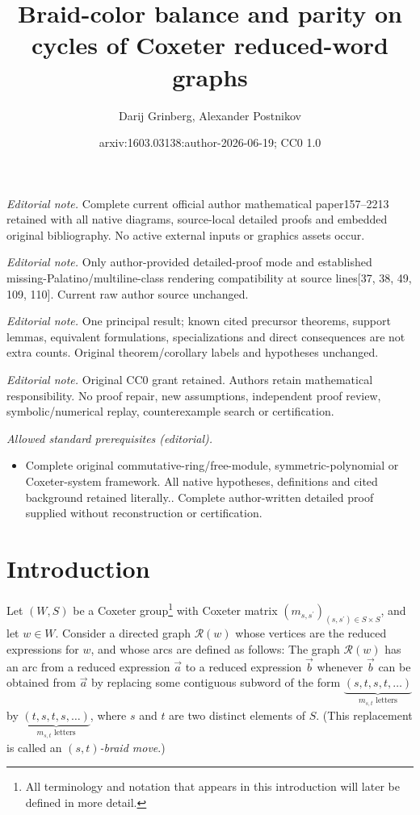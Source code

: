 \documentclass[numbers=enddot,12pt,final,onecolumn,notitlepage,abstracton]{scrartcl}%
\title{Braid-color balance and parity on cycles of Coxeter reduced-word graphs}
\author{Darij Grinberg, Alexander Postnikov}
\date{arxiv:1603.03138:author-2026-06-19; CC0 1.0}
\theoremstyle{definition}
\begin{document}
\maketitle
\noindent\textit{Editorial note.} Complete current official author mathematical paper157--2213 retained with all native diagrams, source-local detailed proofs and embedded original bibliography. No active external inputs or graphics assets occur.\par\medskip
\noindent\textit{Editorial note.} Only author-provided detailed-proof mode and established missing-Palatino/multiline-class rendering compatibility at source lines[37, 38, 49, 109, 110]. Current raw author source unchanged.\par\medskip
\noindent\textit{Editorial note.} One principal result; known cited precursor theorems, support lemmas, equivalent formulations, specializations and direct consequences are not extra counts. Original theorem/corollary labels and hypotheses unchanged.\par\medskip
\noindent\textit{Editorial note.} Original CC0 grant retained. Authors retain mathematical responsibility. No proof repair, new assumptions, independent proof review, symbolic/numerical replay, counterexample search or certification.\par\medskip
\noindent\textit{Allowed standard prerequisites (editorial).}\begin{itemize}
\item Complete original commutative-ring/free-module, symmetric-polynomial or Coxeter-system framework. All native hypotheses, definitions and cited background retained literally.. Complete author-written detailed proof supplied without reconstruction or certification.
\end{itemize}\medskip
\section*{Introduction}

Let $\left(  W,S\right)  $ be a Coxeter group\footnote{All terminology and
notation that appears in this introduction will later be defined in more
detail.} with Coxeter matrix $\left(  m_{s,s^{\prime}}\right)  _{\left(
s,s^{\prime}\right)  \in S\times S}$, and let $w\in W$. Consider a directed
graph $\mathcal{R}\left(  w\right)  $ whose vertices are the reduced
expressions for $w$, and whose arcs are defined as follows: The graph
$\mathcal{R}\left(  w\right)  $ has an arc from a reduced expression
$\overrightarrow{a}$ to a reduced expression $\overrightarrow{b}$ whenever
$\overrightarrow{b}$ can be obtained from $\overrightarrow{a}$ by replacing
some contiguous subword of the form $\underbrace{\left(  s,t,s,t,\ldots
\right)  }_{m_{s,t}\text{ letters}}$ by $\underbrace{\left(  t,s,t,s,\ldots
\right)  }_{m_{s,t}\text{ letters}}$, where $s$ and $t$ are two distinct
elements of $S$. (This replacement is called an $\left(  s,t\right)
$\emph{-braid move}.)
\end{document}

